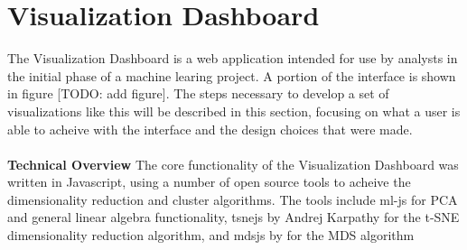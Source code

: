 \documentclass{sigchi}
\begin{document}
%
%
%
%
%







\section{Visualization Dashboard}
The Visualization Dashboard is a web application intended for use by analysts in the initial phase of a machine learing project. A portion of the interface is shown in figure [TODO: add figure]. The steps necessary to develop a set of visualizations like this will be described in this section, focusing on what a user is able to acheive with the interface and the design choices that were made.%
%
\\\\
%
\textbf{Technical Overview}
The core functionality of the Visualization Dashboard was written in Javascript, using a number of open source tools to acheive the dimensionality reduction and cluster algorithms. The tools include ml-js for PCA and general linear algebra functionality, tsnejs by Andrej Karpathy for the t-SNE dimensionality reduction algorithm, and mdsjs by  for the MDS algorithm
\cite{tSNEJS}
\cite{highcharts}
\cite{mljs}
\cite{mdsjs}
\cite{papaparse}
\cite{d3js}
%
\end{document}
